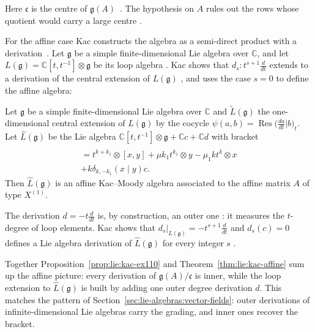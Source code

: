 Here $\mathfrak{c}$ is the centre of $\mathfrak{g}(A)$~\cite[Exercise~1.10, p.~11]{Kac1983}.  The hypothesis on
$A$ rules out the rows whose quotient would carry a large centre
\cite[Exercise~1.10, p.~11]{Kac1983}.

For the affine case Kac constructs the algebra as a semi-direct product
with a derivation~\cite[Proposition~7.3, p.~74]{Kac1983}.  Let $\mathfrak{g}$ be a simple finite-dimensional Lie
algebra over $\mathbb{C}$, and let
$L(\mathfrak{g})=\mathbb{C}[t,t^{-1}]\otimes\mathfrak{g}$ be its loop
algebra \cite[p.~74]{Kac1983}.  Kac shows that
$d_{s}\colon t^{s+1}\frac{d}{dt}$ extends to a derivation of the central
extension of $L(\mathfrak{g})$ \cite[Proposition~7.3, p.~74]{Kac1983}, and
uses the case $s=0$ to define the affine algebra:

\begin{theorem}\label{thm:lie:kac-affine}
Let $\mathfrak{g}$ be a simple finite-dimensional Lie algebra over
$\mathbb{C}$ and $\tilde{L}(\mathfrak{g})$ the one-dimensional central
extension of $L(\mathfrak{g})$ by the cocycle
$\psi(a,b)=\operatorname{Res}\big(\frac{da}{dt}|b\big)_{t}$.  Let
$\hat{L}(\mathfrak{g})$ be the Lie algebra
$\mathbb{C}[t,t^{-1}]\otimes\mathfrak{g}+\mathbb{C}c+\mathbb{C}d$
with bracket
\begin{multline*}
[t^{k}\!\otimes\!x+\lambda c+\mu d,\;t^{k_{1}}\!\otimes\!y+\lambda_{1}c+\mu_{1}d]\\
=t^{k+k_{1}}\!\otimes\![x,y]+\mu k_{1}t^{k_{1}}\!\otimes\!y-\mu_{1}k t^{k}\!\otimes\!x\\
+k\delta_{k,-k_{1}}(x\mid y)c.
\end{multline*}
Then $\hat{L}(\mathfrak{g})$ is an affine Kac--Moody algebra associated
to the affine matrix $A$ of type $X^{(1)}$.
\end{theorem}

The derivation $d=-t\frac{d}{dt}$ is, by construction, an outer one
\cite[p.~74]{Kac1983}: it measures the $t$-degree of loop elements.
Kac shows that
$d_{s}|_{L(\mathfrak{g})}=-t^{s+1}\frac{d}{dt}$ and $d_{s}(c)=0$ defines
a Lie algebra derivation of $\hat{L}(\mathfrak{g})$ for every integer
$s$ \cite[Proposition~7.3, p.~74]{Kac1983}.

Together Proposition~\ref{prop:lie:kac-ex110} and
Theorem~\ref{thm:lie:kac-affine} sum up the affine picture: every
derivation of $\mathfrak{g}(A)/\mathfrak{c}$ is inner, while the loop
extension to $\hat{L}(\mathfrak{g})$ is built by adding one outer
degree derivation $d$.  This matches the pattern of
Section~\ref{sec:lie-algebras:vector-fields}: outer derivations of
infinite-dimensional Lie algebras carry the grading, and inner ones
recover the bracket.


